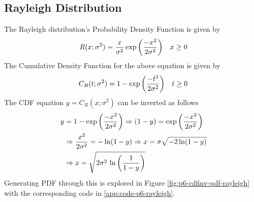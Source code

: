 \documentclass[main.tex]{article}
\begin{document}
    \subsection{Rayleigh Distribution}
    The Rayleigh distribution's Probability Density Function is given by
    \begin{equation}
        R(x; \sigma^2) = \frac{x}{\sigma^2} \, \textup{exp} \left ( \frac{-x^2}{2\sigma^2} \right ) \;\;\; x \ge 0
    \end{equation}
    The Cumulative Density Function for the above equation is given by
    \begin{equation}
        C_R (t; \sigma^2) = 1 - \textup{exp} \left ( \frac{-t^2}{2 \sigma^2} \right ) \;\;\; t \ge 0
    \end{equation}
    The CDF equation $y =  C_R (x; \sigma^2)$ can be inverted as follows
    \begin{equation}
        \begin{split}
            y & = 1 - \textup{exp} \left ( \frac{-x^2}{2 \sigma^2} \right ) 
            \Rightarrow (1-y) = \textup{exp} \left ( \frac{-x^2}{2 \sigma^2} \right ) \\
            & \Rightarrow \frac{x^2}{2 \sigma^2} = -\ln(1-y) \Rightarrow x = \sigma \sqrt{-2 \ln (1-y)} \\
            & \Rightarrow x = \sqrt{2 \sigma^2 \,\ln \left ( \frac{1}{1-y} \right )}
        \end{split}
    \end{equation}
    Generating PDF through this is explored in Figure \ref{fig:p6-cdfinv-pdf-rayleigh} with the corresponding code in \ref{app:code-p6-rayleigh}.
\end{document}
